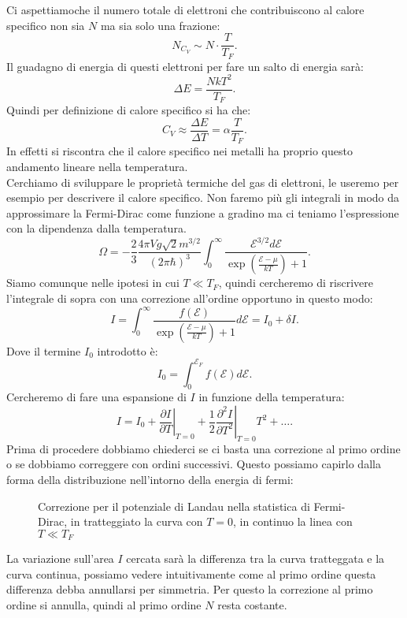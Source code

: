 Ci aspettiamoche il numero totale di elettroni che contribuiscono al calore specifico non sia $N$ ma sia solo una frazione:
\[
	N_{C_{V}} \sim N\cdot \frac{T}{T_{F}}
.\] 
Il guadagno di energia di questi elettroni per fare un salto di energia sarà:
\[
	\Delta E = \frac{N kT^2}{T_{F}}
.\] 
Quindi per definizione di calore specifico si ha che:
\[
	C_{V} \approx \frac{\Delta E}{\Delta  T} = \alpha \frac{T}{T_{F}} \label{eq:stima-Cv-9}
.\] 
In effetti si riscontra che il calore specifico nei metalli ha proprio questo andamento lineare nella temperatura.\\
Cerchiamo di sviluppare le proprietà termiche del gas di elettroni, le useremo per esempio per descrivere il calore specifico. Non faremo più gli integrali in modo da approssimare la Fermi-Dirac come funzione a gradino ma ci teniamo l'espressione con la dipendenza dalla temperatura.
\[
	\Omega = -\frac{2}{3} \frac{4\pi V g \sqrt{2}  m ^{3 /2}  }{\left( 2\pi\hbar  \right) ^3} \int_{0}^{\infty} \frac{\mathcal{E} ^{3 /2}d\mathcal{E} }{\exp\left( \frac{\mathcal{E} -\mu }{kT} \right) +1 } \label{eq:landau-lez-8}
.\] 
Siamo comunque nelle ipotesi in cui $T\ll T_{F}$, quindi cercheremo di riscrivere l'integrale di sopra con una correzione all'ordine opportuno in questo modo:
\[
	I = \int_{0}^{\infty} \frac{f( \mathcal{E} ) }{\exp\left( \frac{\mathcal{E} -\mu }{kT} \right) +1 }d\mathcal{E}  = I_0 + \delta  I 
.\] 
Dove il termine $I_0$ introdotto è:
\[
	I_0 = \int_{0}^{\mathcal{E} _{F}} f( \mathcal{E} ) d\mathcal{E} 
.\] 
Cercheremo di fare una espansione di $I$ in funzione della temperatura:
\[
	I = I_0 + \left.\frac{\partial I}{\partial T} \right|_{T =0} + \frac{1}{2}\left.\frac{\partial ^2I}{\partial T^2} \right|_{T = 0} T^2 + \ldots
.\] 
Prima di procedere dobbiamo chiederci se ci basta una correzione al primo ordine o se dobbiamo correggere con ordini successivi. Questo possiamo capirlo dalla forma della distribuzione nell'intorno della energia di fermi:
\begin{figure}[H]
    \centering
    \caption{\scriptsize Correzione per il potenziale di Landau nella statistica di Fermi-Dirac, in tratteggiato la curva con $T=0$, in continuo la linea con $T\ll T_{F}$}
    \label{fig:correzione-per-il-potenziale-di-landau-nella-statistica-di-fermi-dirac}
\end{figure}
\noindent
La variazione sull'area $I$ cercata sarà la differenza tra la curva tratteggata e la curva continua, possiamo vedere intuitivamente come al primo ordine questa differenza debba annullarsi per simmetria. Per questo la correzione al primo ordine si annulla, quindi al primo ordine $N$ resta costante.\\ 
